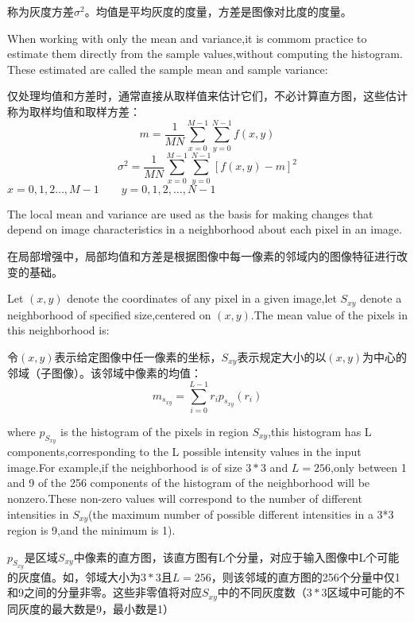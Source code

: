 \documentclass[a4paper,12pt]{article}
\numberwithin{equation}{section}%
\begin{document}
称为灰度方差$\sigma^{2}$。均值是平均灰度的度量，方差是图像对比度的度量。

When working with only the mean and variance,it is commom practice to estimate them directly from the sample values,without computing the histogram. These estimated are called the sample mean and sample variance:

仅处理均值和方差时，通常直接从取样值来估计它们，不必计算直方图，这些估计称为取样均值和取样方差：
\begin{equation} \label {3.20}
m=\frac{1}{MN}\sum_{x=0}^{M-1}\sum_{y=0}^{N-1}f(x,y)
\end{equation}
\begin{equation} \label {3.21}
\sigma^{2}=\frac{1}{MN}\sum_{x=0}^{M-1}\sum_{y=0}^{N-1}[f(x,y)-m]^{2}
\end{equation}
$x=0,1,2\ldots,M-1\qquad y=0,1,2,\ldots,N-1$

The local mean and variance are used as the basis for making changes that depend on image characteristics in a neighborhood about each pixel in an image.

在局部增强中，局部均值和方差是根据图像中每一像素的邻域内的图像特征进行改变的基础。

Let $(x,y)$ denote the coordinates of any pixel in a given image,let $S_{xy}$ denote a neighborhood of specified size,centered on $(x,y)$.The mean value of the pixels in this neighborhood is:

令$(x,y)$表示给定图像中任一像素的坐标，$S_{xy}$表示规定大小的以$(x,y)$为中心的邻域（子图像）。该邻域中像素的均值：
\begin{equation} \label {3.22}
m_{s_{xy}}=\sum_{i=0}^{L-1}r_{i}p_{s_{xy}}(r_{i})
\end{equation}

where $p_{S_{xy}}$ is the histogram of the pixels in region $S_{xy}$,this histogram has L components,corresponding to the L possible intensity values in the input image.For example,if the neighborhood is of size $3*3$ and $L=256$,only between 1 and 9 of the 256 components of the histogram of the neighborhood will be nonzero.These non-zero values will correspond to the number of different intensities in $S_{xy}$(the maximum number of possible different intensities in a 3*3 region is 9,and the minimum is 1).

$p_{S_{xy}}$是区域$S_{xy}$中像素的直方图，该直方图有L个分量，对应于输入图像中L个可能的灰度值。如，邻域大小为$3*3$且$L=256$，则该邻域的直方图的256个分量中仅1和9之间的分量非零。这些非零值将对应$S_{xy}$中的不同灰度数（$3*3$区域中可能的不同灰度的最大数是9，最小数是1）
\end{document}
